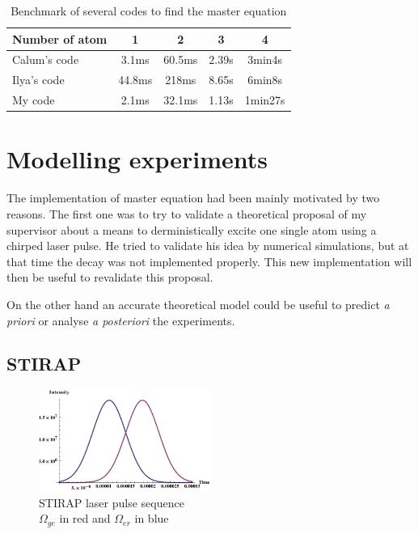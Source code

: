 \documentclass[%
]{scrreprt}
\newcommand{\Om}{\Omega}
\begin{document}
\begin{table}[h]
  \centering
  \begin{tabular}{||l||c c c c||}
    \hline
    Number of atom & 1 & 2 & 3 & 4\\
    \hline \hline
    Calum's code & 3.1ms & 60.5ms & 2.39s & 3min4s\\
    Ilya's code & 44.8ms & 218ms & 8.65s & 6min8s \\
    My code & 2.1ms & 32.1ms & 1.13s & 1min27s \\
    \hline
  \end{tabular}
  \caption{\label{benchmark}Benchmark of several codes to find the master equation}
\end{table}

\section{Modelling experiments}

\par The implementation of master equation had been mainly motivated by two reasons. The first one was to try to validate a theoretical proposal of my supervisor about a means to derministically excite one single atom using a chirped laser pulse. He tried to validate his idea by numerical simulations, but at that time the decay was not implemented properly. This new implementation will then be useful to revalidate this proposal.

\par On the other hand an accurate theoretical model could be useful to predict \emph{a priori} or analyse \emph{a posteriori} the experiments. 

\subsection{STIRAP}

\begin{figure}
  \vspace{-10pt}
  \centering
  \includegraphics[width=0.5\textwidth]{STIRAP-seq.pdf}
  \caption{\label{STIRAP-seq}STIRAP laser pulse sequence\\$\Om_{ge}$ in red and $\Om_{er}$ in blue}
  \vspace{-10pt}
\end{figure}
\end{document}
